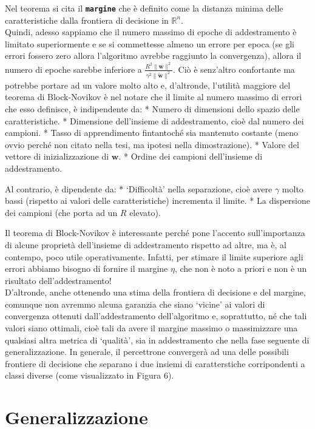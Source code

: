 \documentclass[
  letterpaper,
  DIV=11,
  numbers=noendperiod]{scrreprt}
\begin{document}
Nel teorema si cita il \textbf{\texttt{margine}} che è definito come la
distanza minima delle caratteristiche dalla frontiera di decisione in
\(\mathbb{R}^n\).\\
Quindi, adesso sappiamo che il numero massimo di epoche di addestramento
è limitato superiormente e se si commettesse almeno un errore per epoca
(se gli errori fossero zero allora l'algoritmo avrebbe raggiunto la
convergenza), allora il numero di epoche sarebbe inferiore a
\(\frac{R^2\lVert\mathbf{w}\rVert^2}{\gamma^2\rVert\widetilde{\mathbf{w}}\lVert^2}\).
Ciò è senz'altro confortante ma potrebbe portare ad un valore molto alto
e, d'altronde, l'utilità maggiore del teorema di Block-Novikov è nel
notare che il limite al numero massimo di errori che esso definisce, è
indipendente da: * Numero di dimensioni dello spazio delle
caratteristiche. * Dimensione dell'insieme di addestramento, cioè dal
numero dei campioni. * Tasso di apprendimento fintantoché sia mantenuto
costante (meno ovvio perché non citato nella tesi, ma ipotesi nella
dimostrazione). * Valore del vettore di inizializzazione di
\(\mathbf{w}\). * Ordine dei campioni dell'insieme di addestramento.

Al contrario, è dipendente da: * `Difficoltà' nella separazione, cioè
avere \(\gamma\) molto bassi (rispetto ai valori delle caratteristiche)
incrementa il limite. * La dispersione dei campioni (che porta ad un
\(R\) elevato).

Il teorema di Block-Novikov è interessante perché pone l'accento
sull'importanza di alcune proprietà dell'insieme di addestramento
rispetto ad altre, ma è, al contempo, poco utile operativamente.
Infatti, per stimare il limite superiore agli errori abbiamo bisogno di
fornire il margine \(\eta\), che non è noto a priori e non è un
risultato dell'addestramento!\\
D'altronde, anche ottenendo una stima della frontiera di decisione e del
margine, comunque non avremmo alcuna garanzia che siano `vicine' ai
valori di convergenza ottenuti dall'addestramento dell'algoritmo e,
soprattutto, né che tali valori siano ottimali, cioè tali da avere il
margine massimo o massimizzare una qualsiasi altra metrica di `qualità',
sia in addestramento che nella fase seguente di generalizzazione. In
generale, il percettrone convergerà ad una delle possibili frontiere di
decisione che separano i due insiemi di caratterstiche corripondenti a
classi diverse (come visualizzato in Figura 6).

\section{Generalizzazione}\label{generalizzazione}
\end{document}
